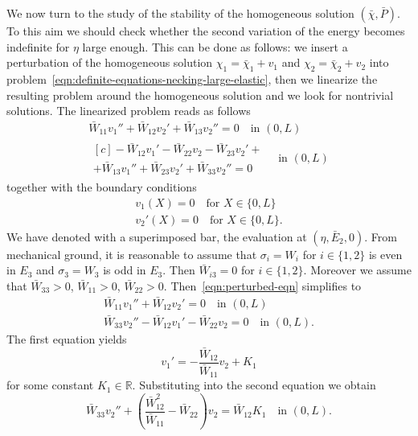 \documentclass[a4paper,10pt,twoside]{amsbook}
\numberwithin{section}{chapter}
\numberwithin{equation}{chapter}
\theoremstyle{definition}
\begin{document}
We now turn to the study of the stability of the homogeneous solution $(\bar{\chi},\bar{P})$. To this aim we should check whether the second variation of the energy becomes indefinite for $\eta$ large enough. This can be done as follows: we insert a perturbation of the homogeneous solution $\chi_1=\bar\chi_1+v_1$ and $\chi_2=\bar\chi_2+v_2$ into problem~\eqref{eqn:definite-equations-necking-large-elastic}, then we linearize the resulting problem around the homogeneous solution and we look for nontrivial solutions. The linearized problem reads as follows
\begin{subequations}
\label{eqn:perturbed-eqn}
\begin{gather}
\bar W_{11}v_1''+\bar W_{12}v_2'+\bar W_{13}v_2''=0\quad\text{in $(0,L)$} \\
\begin{multlined}[c]
-\bar W_{12}v_1'-\bar W_{22}v_2-\bar W_{23}v_2'+\\
+\bar W_{13}v_1''+\bar W_{23}v_2'+\bar W_{33}v_2''=0
\end{multlined}
\quad\text{in $(0,L)$}
\end{gather}
\end{subequations}
together with the boundary conditions
\begin{gather}
\label{eqn:perturbed-bound}
v_1(X)=0\quad\text{for $X\in\{0,L\}$} \\
v_2'(X)=0\quad\text{for $X\in\{0,L\}$}.
\end{gather}
We have denoted with a superimposed bar, the evaluation at $(\eta,\bar E_2,0)$. From mechanical ground, it is reasonable to assume that $\sigma_i=W_i$ for $i\in\{1,2\}$ is even in $E_3$ and $\sigma_3=W_3$ is odd in $E_3$. Then $\bar W_{i3}=0$ for $i\in\{1,2\}$. Moreover we assume that $\bar W_{33}>0$, $\bar W_{11}>0$, $\bar W_{22}>0$. Then~\eqref{eqn:perturbed-eqn} simplifies to
\begin{subequations}
\begin{gather}
\bar W_{11}v_1''+\bar W_{12}v_2'=0\quad\text{in $(0,L)$} \\
\bar W_{33}v_2''-\bar W_{12}v_1'-\bar W_{22}v_2=0 \quad\text{in $(0,L)$}.
\end{gather}
\end{subequations}
The first equation yields
\begin{equation}
\label{eqn:v1prime}
v_1'=-\frac{\bar{W}_{12}}{\bar{W}_{11}}v_2+K_1
\end{equation}
for some constant $K_1\in\mathbb{R}$. Substituting into the second equation we obtain
\[
\bar W_{33}v_2''+\left(\frac{\bar{W}_{12}^2}{\bar{W}_{11}}-\bar W_{22}\right)v_2=\bar W_{12}K_1 \quad\text{in $(0,L)$}.
\]
\end{document}
